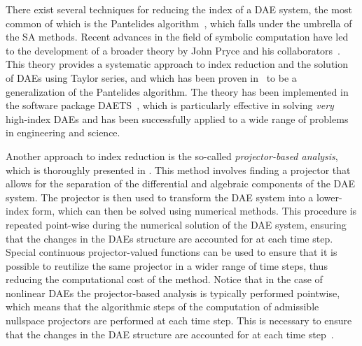 There exist several techniques for reducing the index of a \ac{DAE} system, the most common of which is the Pantelides algorithm~\cite{pantelides1988consistent}, which falls under the umbrella of the \ac{SA} methods. Recent advances in the field of symbolic computation have led to the development of a broader theory by John Pryce and his collaborators~\cite{pryce1998solving}. This theory provides a systematic approach to index reduction and the solution of \acp{DAE} using Taylor series, and which has been proven in~\cite{pryce2001simple} to be a generalization of the Pantelides algorithm. The theory has been implemented in the software package \textsc{DAETS}~\cite{nedialkov2007solvingI, nedialkov2007solvingII, nedialkov2008solvingIII}, which is particularly effective in solving \emph{very} high-index \acp{DAE} and has been successfully applied to a wide range of problems in engineering and science.

Another approach to index reduction is the so-called \emph{projector-based analysis}, which is thoroughly presented in \citet{lamour2013differential, marz2014differential}. This method involves finding a projector that allows for the separation of the differential and algebraic components of the \ac{DAE} system. The projector is then used to transform the \ac{DAE} system into a lower-index form, which can then be solved using numerical methods. This procedure is repeated point-wise during the numerical solution of the \ac{DAE} system, ensuring that the changes in the \acp{DAE} structure are accounted for at each time step. Special continuous projector-valued functions can be used to ensure that it is possible to reutilize the same projector in a wider range of time steps, thus reducing the computational cost of the method. Notice that in the case of nonlinear \acp{DAE} the projector-based analysis is typically performed pointwise, which means that the algorithmic steps of the computation of admissible nullspace projectors are performed at each time step. This is necessary to ensure that the changes in the \ac{DAE} structure are accounted for at each time step~\cite{lamour2011computational, lamour2012detecting}.

